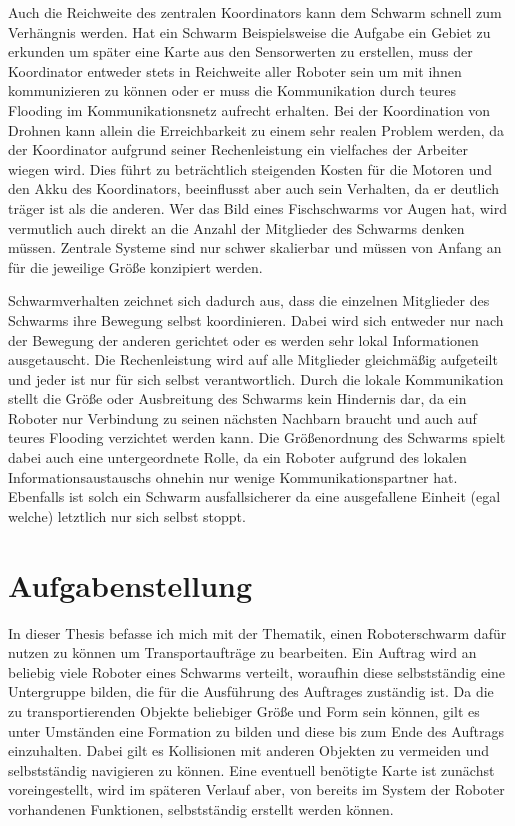 Auch die Reichweite des zentralen Koordinators kann dem Schwarm schnell zum Verhängnis werden. Hat ein Schwarm Beispielsweise die Aufgabe ein Gebiet zu erkunden um später eine Karte aus den Sensorwerten zu erstellen, muss der Koordinator entweder stets in Reichweite aller Roboter sein um mit ihnen kommunizieren zu können oder er muss die Kommunikation durch teures Flooding im Kommunikationsnetz aufrecht erhalten. Bei der Koordination von Drohnen kann allein die Erreichbarkeit zu einem sehr realen Problem werden, da der Koordinator aufgrund seiner Rechenleistung ein vielfaches der Arbeiter wiegen wird. Dies führt zu beträchtlich steigenden Kosten für die Motoren und den Akku des Koordinators, beeinflusst aber auch sein Verhalten, da er deutlich träger ist als die anderen.
Wer das Bild eines Fischschwarms vor Augen hat, wird vermutlich auch direkt an die Anzahl der Mitglieder des Schwarms denken müssen. Zentrale Systeme sind nur schwer skalierbar und müssen von Anfang an für die jeweilige Größe konzipiert werden.

Schwarmverhalten zeichnet sich dadurch aus, dass die einzelnen Mitglieder des Schwarms ihre Bewegung selbst koordinieren. Dabei wird sich entweder nur nach der Bewegung der anderen gerichtet oder es werden sehr lokal Informationen ausgetauscht. Die Rechenleistung wird auf alle Mitglieder gleichmäßig aufgeteilt und jeder ist nur für sich selbst verantwortlich. Durch die lokale Kommunikation stellt die Größe oder Ausbreitung des Schwarms kein Hindernis dar, da ein Roboter nur Verbindung zu seinen nächsten Nachbarn braucht und auch auf teures Flooding verzichtet werden kann. Die Größenordnung des Schwarms spielt dabei auch eine untergeordnete Rolle, da ein Roboter aufgrund des lokalen Informationsaustauschs ohnehin nur wenige Kommunikationspartner hat. Ebenfalls ist solch ein Schwarm ausfallsicherer da eine ausgefallene Einheit (egal welche) letztlich nur sich selbst stoppt. 

\section{Aufgabenstellung}\label{sec:Aufgabenstellung}
In dieser Thesis befasse ich mich mit der Thematik, einen Roboterschwarm dafür nutzen zu können um Transportaufträge zu bearbeiten. Ein Auftrag wird an beliebig viele Roboter eines Schwarms verteilt, woraufhin diese selbstständig eine Untergruppe bilden, die für die Ausführung des Auftrages zuständig ist. Da die zu transportierenden Objekte beliebiger Größe und Form sein können, gilt es unter Umständen eine Formation zu bilden und diese bis zum Ende des Auftrags einzuhalten. Dabei gilt es Kollisionen mit anderen Objekten zu vermeiden und selbstständig navigieren zu können. Eine eventuell benötigte Karte ist zunächst voreingestellt, wird im späteren Verlauf aber, von bereits im System der Roboter vorhandenen Funktionen, selbstständig erstellt werden können.

